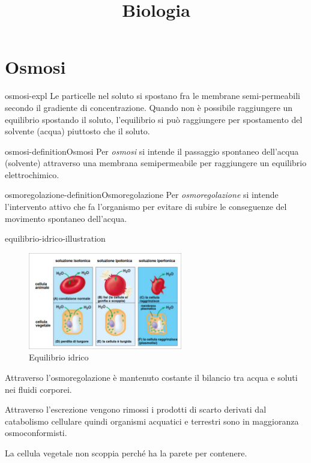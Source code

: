 \documentclass[preview]{standalone}
\begin{document}
\title{Biologia}
\genpage

\section{Osmosi}

\begin{snippet}{osmosi-expl}
    Le particelle nel soluto si spostano fra le membrane semi-permeabili secondo il gradiente
di concentrazione. Quando non è possibile raggiungere un equilibrio spostando il soluto,
l'equilibrio si può raggiungere per spostamento del solvente (acqua) piuttosto che il soluto.
\end{snippet}

\begin{snippetdefinition}{osmosi-definition}{Osmosi}
    Per \textit{osmosi} si intende il passaggio spontaneo dell'acqua (solvente) attraverso una membrana semipermeabile
    per raggiungere un equilibrio elettrochimico.
\end{snippetdefinition}

\begin{snippetdefinition}{osmoregolazione-definition}{Osmoregolazione}
    Per \textit{osmoregolazione} si intende l'intervento attivo che fa l'organismo per evitare di subire le conseguenze del movimento spontaneo dell'acqua.
\end{snippetdefinition}

\begin{snippet}{equilibrio-idrico-illustration}
    \setlength{\intextsep}{0pt}%
    \begin{figure}
        \includegraphics[width=0.6\textwidth]{./resources/equilibrio_idrico.png}
        \caption{Equilibrio idrico}
        \vspace{-1cm}
    \end{figure}

    Attraverso l'osmoregolazione è mantenuto costante il bilancio tra acqua e soluti
    nei fluidi corporei.

    Attraverso l'escrezione vengono rimossi i prodotti di scarto
    derivati dal catabolismo cellulare quindi organismi acquatici e terrestri sono in
    maggioranza osmoconformisti.

    La cellula vegetale non scoppia perché ha la parete per contenere.

    \wrapfill
\end{snippet}
\end{document}
